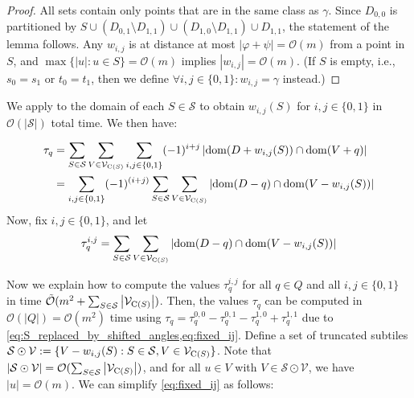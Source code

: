\documentclass[twoside,leqno]{article}
\renewcommand{\O}{\mathcal{O}}
\newcommand{\tO}{\tilde{\mathcal{O}}}
\renewcommand{\S}{\mathcal{S}}
\newcommand{\V}{\mathcal{V}}
\renewcommand{\phi}{\varphi}
\newcommand{\absolute}[1]{\left\lvert#1\right\rvert}
\begin{document}
\begin{lemma}
\begin{proof}
\vspace{.5\baselineskip}

All sets contain only points that are in the same class as $\gamma$. 
Since $D_{0,0}$ is partitioned by $S \cup (D_{0, 1}\setminus D_{1, 1}) \cup (D_{1, 0}\setminus D_{1, 1}) \cup D_{1, 1}$, the statement of the lemma follows. 
Any $w_{i, j}$ is at distance at most $\absolute{\phi + \psi} = \O(m)$ from a point in $S$, and $\max \{\absolute{u} : u \in S\} = \O(m)$ implies $\absolute{w_{i,j}} = \O(m)$. 
(If $S$ is empty, i.e., $s_0 = s_1$ or $t_0 = t_1$, then we define $\forall i,j\in\{0, 1\} : w_{i,j} = \gamma$ instead.)
\end{proof}

\end{lemma}


We apply  to the domain of each $S\in \S$ to obtain $w_{i, j}(S)$ for $i,j \in \{0,1\}$ in $\O(\absolute{\S})$ total time. We then have:

\begin{align}
\label{eq:S_replaced_by_shifted_angles}
\begin{split}
\tau_q &= \sum_{S \in \S} \sum_{V \in \V_{\getchar{S}}} \sum_{i,j \in \{0,1\}} (-1)^{i+j} \absolute{\d{D+w_{i, j}(S)} \cap \d{V + q}} \\
& = \sum_{i,j \in \{0,1\}} (-1)^{(i+j)} \sum_{S \in \S} \sum_{V \in \V_{\getchar{S}}} \absolute{\d{D-q} \cap \d{V-w_{i, j}(S)}}
\end{split}
\end{align}
%
Now, fix $i,j \in \{0,1\}$, and let 
%
\begin{equation}
\label{eq:fixed_ij}
\tau_q^{i,j} = \sum_{S \in \S} \sum_{V \in \V_{\getchar{S}}} \absolute{\d{D-q} \cap \d{V-w_{i, j}(S)}}
\end{equation}

Now we explain how to compute the values $\tau_q^{i,j}$ for all $q \in Q$ and all $i,j \in \{0,1\}$ in time $\tO(m^2 + \sum_{S \in \S} \absolute{\V_{\getchar{S}}})$. Then, the values $\tau_q$ can be computed in $\O(\absolute{Q}) = \O(m^2)$ time using $\tau_q = \tau^{0,0}_q - \tau^{0,1}_q - \tau^{1,0}_q + \tau^{1,1}_q$ due to \cref{eq:S_replaced_by_shifted_angles,eq:fixed_ij}. 
Define a set of truncated subtiles $\S \odot \V := \{V-w_{i, j}(S) : S \in \S, V \in \V_{\getchar{S}}\}$.  Note that $\absolute{\S \odot \V} = \O(\sum_{S \in \S} \absolute{\V_{\getchar{S}}})$, and for all $u \in V$ with $V \in \S \odot \V$, we have $\absolute{u} = \O(m)$. We can simplify \cref{eq:fixed_ij} as follows:
\end{document}
